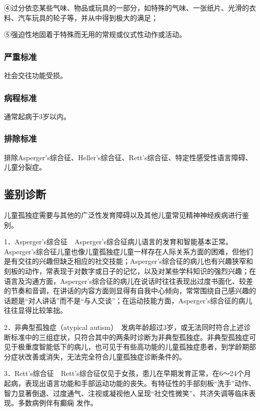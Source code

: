 ④过分依恋某些气味、物品或玩具的一部分，如特殊的气味、一张纸片、光滑的衣料、汽车玩具的轮子等，并从中得到极大的满足；

⑤强迫性地固着于特殊而无用的常规或仪式性动作或活动。

\subsubsection{严重标准}

社会交往功能受损。

\subsubsection{病程标准}

通常起病于3岁以内。

\subsubsection{排除标准}

排除Asperger's综合征、Heller's综合征、Rett's综合征、特定性感受性语言障碍、儿童分裂症。

\subsection{鉴别诊断}

儿童孤独症需要与其他的广泛性发育障碍以及其他儿童常见精神神经疾病进行鉴别。

1．Asperger's综合征　Asperger's综合征病儿语言的发育和智能基本正常。Asperger's综合征儿童也像儿童孤独症儿童一样存在人际关系方面的困难，但他们是有交往的兴趣但缺乏相应的社交技能；Asperger's综合征的病儿也有兴趣狭窄和刻板的动作，常表现于对数字或日子的记忆，以及对某些学科知识的强烈兴趣；在语言及沟通方面，Asperger's综合征的病儿在说话时往往表现出过度书面化、较差的节奏和音调，在讲话的内容方面则显得有自我中心倾向，常常围绕自己感兴趣的话题是“对人讲话”而不是“与人交谈”；在运动技能方面，Asperger's综合征的病儿往往显得比较笨拙。

2．非典型孤独症（atypical
autism）　发病年龄超过3岁，或无法同时符合上述诊断标准中的三组症状，只符合其中的两条时诊断为非典型孤独症。非典型孤独症可见于极重度智能低下的病儿，也可见于有些高功能的儿童孤独症患者，到学龄期部分症状改善或消失，无法完全符合儿童孤独症诊断条件的。

3．Rett's综合征　Rett's综合征仅见于女孩，患儿在早期发育正常，在6～24个月起病，表现出语言功能和手部运动功能的丧失。有特征性的手部刻板“洗手”动作、智力显著倒退、过度通气、注视或凝视他人呈现“社交性微笑”、共济失调等临床表现。多数病例伴有癫痫
发作。

